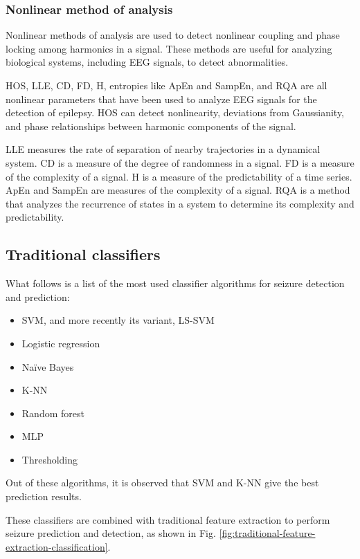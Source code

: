 \subsubsection{Nonlinear method of analysis}
Nonlinear methods of analysis are used to detect nonlinear coupling and phase locking among harmonics in a signal. 
These methods are useful for analyzing biological systems, including EEG signals, to detect abnormalities. 

\gls{HOS}, \gls{LLE}, \gls{CD}, \gls{FD}, \gls{H}, entropies like \gls{ApEn} and \gls{SampEn}, and \gls{RQA} are all nonlinear parameters that have been used to analyze EEG signals for the detection of epilepsy. \gls{HOS} can detect nonlinearity, deviations from Gaussianity, and phase relationships between harmonic components of the signal. 

\gls{LLE} measures the rate of separation of nearby trajectories in a dynamical system. \gls{CD} is a measure of the degree of randomness in a signal. \gls{FD} is a measure of the complexity of a signal. \gls{H} is a measure of the predictability of a time series. \gls{ApEn} and \gls{SampEn} are measures of the complexity of a signal. \gls{RQA} is a method that analyzes the recurrence of states in a system to determine its complexity and predictability.

\subsection{Traditional classifiers}

What follows is a list of the most used classifier algorithms for seizure detection and prediction:

\begin{itemize}
    \item \gls{SVM}, and more recently its variant, \gls{LS-SVM} 
    \item Logistic regression 
    \item Naïve Bayes 
    \item \gls{K-NN} 
    \item Random forest
    \item \gls{MLP}
    \item Thresholding
\end{itemize}

Out of these algorithms, it is observed that \gls{SVM} and \gls{K-NN} give the best prediction results.

These classifiers are combined with traditional feature extraction to perform seizure prediction and detection, as shown in Fig. \ref{fig:traditional-feature-extraction-classification}.

